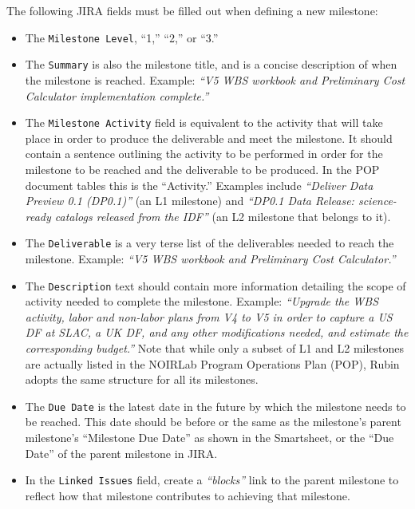 The following \gls{JIRA} fields must be filled out when defining a new milestone:
\begin{itemize}
\item The \texttt{Milestone Level}, ``1,'' ``2,'' or ``3.''
\item The \texttt{Summary} is also the milestone title, and is a concise description of when the milestone is reached.
Example: \textit{``V5 \gls{WBS} workbook and Preliminary Cost Calculator implementation complete.''}
\item The \texttt{Milestone Activity} field is equivalent to the activity that will take place in order to produce the deliverable and meet the milestone.  It should contain a sentence outlining the activity to be performed in order for the milestone to be reached and the deliverable to be produced. In the \gls{POP} document tables this is the ``Activity.''
  Examples include \textit{``Deliver Data Preview 0.1 (DP0.1)''} (an L1 milestone) and \textit{``DP0.1 \gls{Data Release}: science-ready catalogs released from the \gls{IDF}''} (an \gls{L2} milestone that belongs to it).
\item The \texttt{Deliverable} is a very terse list of the deliverables needed to reach the milestone.
  Example: \textit{``V5 \gls{WBS} workbook and Preliminary Cost Calculator.''}
\item The \texttt{Description} text should contain more information detailing the scope of activity needed to complete the milestone.
  Example: \textit{``Upgrade the WBS activity, labor and non-labor plans from V4 to V5 in order to capture a \gls{US} \gls{DF} at SLAC, a \gls{UK} \gls{DF}, and any other modifications needed, and estimate the corresponding budget.''}
  Note that while only a subset of L1 and L2 milestones are actually listed in the \gls{NOIRLab} Program \gls{Operations} Plan (\gls{POP}), Rubin adopts the same structure for all its milestones.
\item The \texttt{Due Date} is the latest date in the future by which the milestone needs to be reached.
  This date should be before or the same as the milestone's parent milestone's ``Milestone Due Date'' as shown in the Smartsheet, or the ``Due Date'' of the parent milestone in \gls{JIRA}.
\item In the \texttt{Linked Issues} field, create a \textit{``blocks''} link to the parent milestone to reflect how that milestone contributes to achieving that milestone.
\end{itemize}

